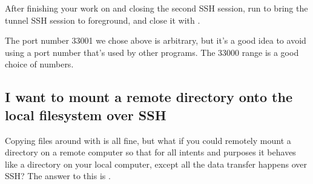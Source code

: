 After finishing your work on  and closing the second SSH session,
run  to bring the tunnel SSH session to foreground, and close it with
.

The port number 33001 we chose above is arbitrary, but it's a good idea to avoid
using a port number that's used by other programs. The 33000 range is a good
choice of numbers.

\subsection{I want to mount a remote directory onto the local filesystem over
SSH}

Copying files around with  is all fine, but what if you could remotely
mount a directory on a remote computer so that for all intents and purposes it
behaves like a directory on your local computer, except all the data transfer
happens over SSH? The answer to this is .

